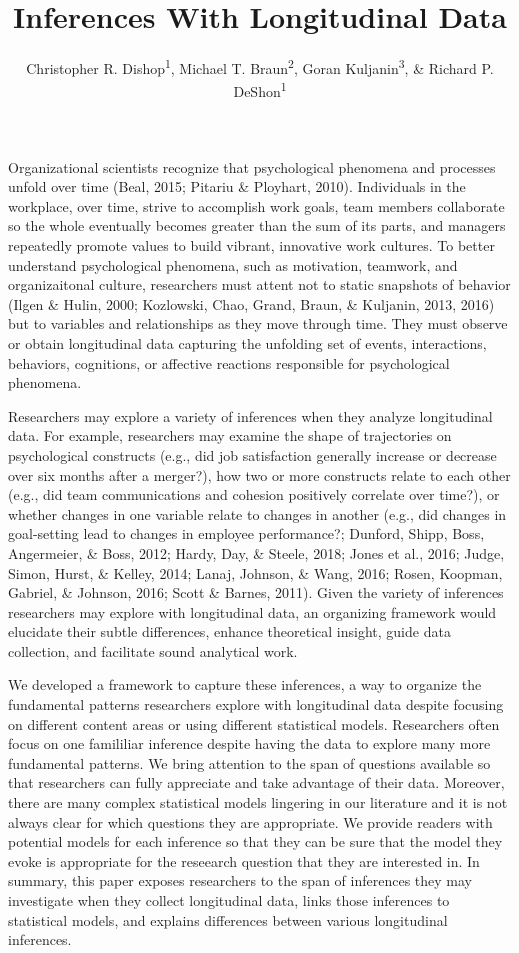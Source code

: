 \documentclass[english,,man]{apa6}
\title{Inferences With Longitudinal Data}
\author{Christopher R. Dishop\textsuperscript{1}, Michael T.
Braun\textsuperscript{2}, Goran Kuljanin\textsuperscript{3}, \& Richard
P. DeShon\textsuperscript{1}}
\date{}
\affiliation{
\vspace{0.5cm}
\textsuperscript{1} Michigan State University\\\textsuperscript{2} University of South Florida\\\textsuperscript{3} DePaul University}
\theoremstyle{definition}
\theoremstyle{definition}
\theoremstyle{definition}
\theoremstyle{remark}
\begin{document}
\maketitle

Organizational scientists recognize that psychological phenomena and
processes unfold over time (Beal, 2015; Pitariu \& Ployhart, 2010).
Individuals in the workplace, over time, strive to accomplish work
goals, team members collaborate so the whole eventually becomes greater
than the sum of its parts, and managers repeatedly promote values to
build vibrant, innovative work cultures. To better understand
psychological phenomena, such as motivation, teamwork, and
organizaitonal culture, researchers must attent not to static snapshots
of behavior (Ilgen \& Hulin, 2000; Kozlowski, Chao, Grand, Braun, \&
Kuljanin, 2013, 2016) but to variables and relationships as they move
through time. They must observe or obtain longitudinal data capturing
the unfolding set of events, interactions, behaviors, cognitions, or
affective reactions responsible for psychological phenomena.

Researchers may explore a variety of inferences when they analyze
longitudinal data. For example, researchers may examine the shape of
trajectories on psychological constructs (e.g., did job satisfaction
generally increase or decrease over six months after a merger?), how two
or more constructs relate to each other (e.g., did team communications
and cohesion positively correlate over time?), or whether changes in one
variable relate to changes in another (e.g., did changes in goal-setting
lead to changes in employee performance?; Dunford, Shipp, Boss,
Angermeier, \& Boss, 2012; Hardy, Day, \& Steele, 2018; Jones et al.,
2016; Judge, Simon, Hurst, \& Kelley, 2014; Lanaj, Johnson, \& Wang,
2016; Rosen, Koopman, Gabriel, \& Johnson, 2016; Scott \& Barnes, 2011).
Given the variety of inferences researchers may explore with
longitudinal data, an organizing framework would elucidate their subtle
differences, enhance theoretical insight, guide data collection, and
facilitate sound analytical work.

We developed a framework to capture these inferences, a way to organize
the fundamental patterns researchers explore with longitudinal data
despite focusing on different content areas or using different
statistical models. Researchers often focus on one famililiar inference
despite having the data to explore many more fundamental patterns. We
bring attention to the span of questions available so that researchers
can fully appreciate and take advantage of their data. Moreover, there
are many complex statistical models lingering in our literature and it
is not always clear for which questions they are appropriate. We provide
readers with potential models for each inference so that they can be
sure that the model they evoke is appropriate for the reseearch question
that they are interested in. In summary, this paper exposes researchers
to the span of inferences they may investigate when they collect
longitudinal data, links those inferences to statistical models, and
explains differences between various longitudinal inferences.
\end{document}
